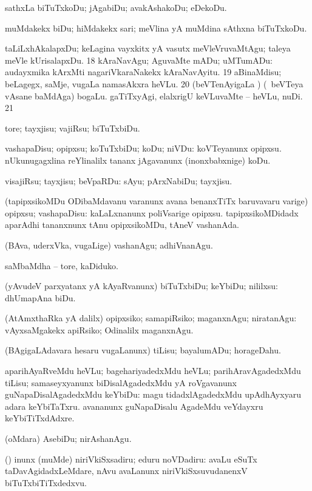 {{ sathxLa biTuTxkoDu; jAgabiDu; avakAshakoDu; eDekoDu. 

 muMdakekx biDu; hiMdakekx sari; meVlina yA muMdina sAthxna biTuTxkoDu. 

 taLiLxhAkalapxDu; keLagina vayxkitx yA vasutx 
meVleVruvaMtAgu; taleya meVle kUrisalapxDu. 
\num{18}  kAraNavAgu; AguvaMte mADu; uMTumADu:  audayxmika kArxMti nagariVkaraNakekx kAraNavAyitu.
\num{19}  aBinaMdisu; beLagegx, saMje, \mo vugaLa
namasAkxra heVLu. 
\num{20}   (beVTenAyigaLa \vi)
(\kanmu\ beVTeya vAsane baMdAga) bogaLu.  gaTiTxyAgi, elalxrigU keVLuvaMte -- heVLu, nuDi. 
\num{21}  

 tore; tayxjisu; vajiRsu; biTuTxbiDu. 

 vashapaDisu; opipxsu; koTuTxbiDu; koDu; niVDu:  koVTeyanunx opipxsu.  nUkunugagxlina reYlinalilx tananx jAgavanunx (inonxbabxnige) koDu. 

 visajiRsu; tayxjisu; beVpaRDu:  sAyu;
  pArxNabiDu; tayxjisu.
 
 (tapipxsikoMDu ODibaMdavanu \mo varanunx avana benanxTiTx baruvavaru \mo
varige) opipxsu; vashapaDisu: 
kaLaLxnanunx poliVsarige opipxsu.   tapipxsikoMDidadx aparAdhi tananxnunx tAnu
  opipxsikoMDu, tAneV vashanAda. 

 (BAva, uderxVka, \mo vugaLige) vashanAgu;
adhiVnanAgu. 

 saMbaMdha -- tore, kaDiduko. 

 (yAvudeV parxyatanx yA kAyaRvanunx) biTuTxbiDu; keYbiDu; nililxsu:  dhUmapAna biDu. 

 (AtAmxthaRka yA \BUkaq dalilx) opipxsiko; samapiRsiko; maganxnAgu;
niratanAgu:  vAyxsaMgakekx apiRsiko; Odinalilx maganxnAgu. 

 (BAgigaLAdavara hesaru \mo vugaLanunx) tiLisu; bayalumADu; horageDahu. 

 aparihAyaRveMdu heVLu; bagehariyadedxMdu heVLu; parihAravAgadedxMdu tiLisu; samaseyxyanunx biDisalAgadedxMdu yA roVgavanunx guNapaDisalAgadedxMdu keYbiDu: 
magu tidadxlAgadedxMdu upAdhAyxyaru adara keYbiTaTxru.  avananunx guNapaDisalu AgadeMdu veYdayxru keYbiTiTxdAdxre. 

 (oMdara) AsebiDu; nirAshanAgu. 

 (\AmA) inunx (muMde) niriVkiSxsadiru; eduru noVDadiru:  avaLu eSuTx
taDavAgidadxLeMdare, nAvu avaLanunx niriVkiSxsuvudanenxV biTuTxbiTiTxdedxvu.}}


